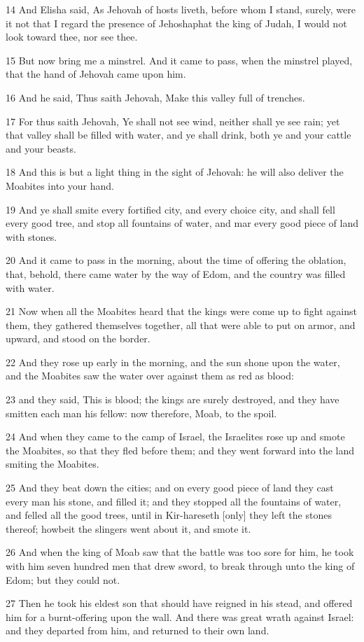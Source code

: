 \par 14 And Elisha said, As Jehovah of hosts liveth, before whom I stand, surely, were it not that I regard the presence of Jehoshaphat the king of Judah, I would not look toward thee, nor see thee.
\par 15 But now bring me a minstrel. And it came to pass, when the minstrel played, that the hand of Jehovah came upon him.
\par 16 And he said, Thus saith Jehovah, Make this valley full of trenches.
\par 17 For thus saith Jehovah, Ye shall not see wind, neither shall ye see rain; yet that valley shall be filled with water, and ye shall drink, both ye and your cattle and your beasts.
\par 18 And this is but a light thing in the sight of Jehovah: he will also deliver the Moabites into your hand.
\par 19 And ye shall smite every fortified city, and every choice city, and shall fell every good tree, and stop all fountains of water, and mar every good piece of land with stones.
\par 20 And it came to pass in the morning, about the time of offering the oblation, that, behold, there came water by the way of Edom, and the country was filled with water.
\par 21 Now when all the Moabites heard that the kings were come up to fight against them, they gathered themselves together, all that were able to put on armor, and upward, and stood on the border.
\par 22 And they rose up early in the morning, and the sun shone upon the water, and the Moabites saw the water over against them as red as blood:
\par 23 and they said, This is blood; the kings are surely destroyed, and they have smitten each man his fellow: now therefore, Moab, to the spoil.
\par 24 And when they came to the camp of Israel, the Israelites rose up and smote the Moabites, so that they fled before them; and they went forward into the land smiting the Moabites.
\par 25 And they beat down the cities; and on every good piece of land they cast every man his stone, and filled it; and they stopped all the fountains of water, and felled all the good trees, until in Kir-hareseth [only] they left the stones thereof; howbeit the slingers went about it, and smote it.
\par 26 And when the king of Moab saw that the battle was too sore for him, he took with him seven hundred men that drew sword, to break through unto the king of Edom; but they could not.
\par 27 Then he took his eldest son that should have reigned in his stead, and offered him for a burnt-offering upon the wall. And there was great wrath against Israel: and they departed from him, and returned to their own land.

